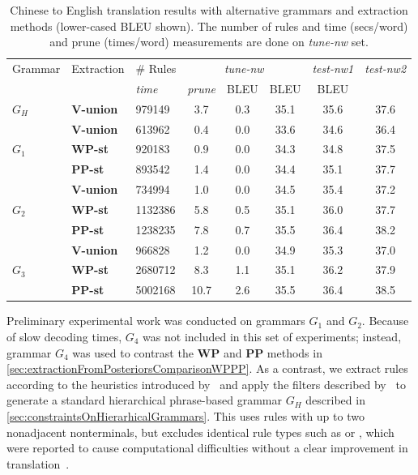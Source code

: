 \begin{table}
  \begin{center}
    \begin{tabular}{|l|l|l||c|c|c||c||c|}
      \hline
      Grammar & Extraction & \# Rules & \multicolumn{3}{c||}{{\em tune-nw}} & {\em test-nw1} & {\em test-nw2} \\  \cline{3-7}
      &            & {\em time} & {\em prune} & BLEU & BLEU & BLEU \\ \hline
      $G_H$ & {\bf V-union} & 979149 & 3.7 & 0.3 & 35.1 & 35.6 & 37.6  \\
      \hline
      & {\bf V-union} & 613962 & 0.4 & 0.0 & 33.6 & 34.6 & 36.4  \\
      $G_1$ & {\bf WP-st} & 920183 & 0.9 & 0.0  & 34.3 & 34.8 & 37.5  \\
      & {\bf PP-st} & 893542 & 1.4 & 0.0 & 34.4 & 35.1 & 37.7   \\
      \hline
      & {\bf V-union} & 734994 & 1.0 & 0.0 & 34.5  & 35.4  & 37.2   \\
      $G_2$ & {\bf WP-st} & 1132386 & 5.8 & 0.5 & 35.1 & 36.0  & 37.7   \\
      & {\bf PP-st} & 1238235 & 7.8 & 0.7 & 35.5 & 36.4  & 38.2   \\
      \hline
      & {\bf V-union} & 966828 & 1.2 & 0.0 & 34.9 & 35.3  & 37.0   \\
      $G_3$ & {\bf WP-st} & 2680712 & 8.3 & 1.1 & 35.1  & 36.2  & 37.9   \\
      & {\bf PP-st} & 5002168 & 10.7 &  2.6  & 35.5 & 36.4  & 38.5  \\
      \hline
    \end{tabular}
    \caption{Chinese to English translation results with alternative grammars and extraction methods (lower-cased BLEU shown). The number of rules and time (secs/word) and prune (times/word) measurements are done on {\em tune-nw} set.}
    \label{tab:extractionFromPosteriorsTranslationResults}
  \end{center}
\end{table}
%
Preliminary experimental work
was conducted on grammars $G_1$ and $G_2$.
Because of slow decoding times, $G_4$ was not included in this set
of experiments; instead, grammar $G_4$ was used to contrast the \textbf{WP}
and \textbf{PP} methods in \autoref{sec:extractionFromPosteriorsComparisonWPPP}.
As a contrast, we extract rules according to the heuristics introduced
by~\citet{chiang:2007:CL} and apply the filters described
by~\citet{iglesias-degispert-banga-byrne:2009:EACL} to generate a standard
hierarchical phrase-based grammar $G_H$ described in
\autoref{sec:constraintsOnHierarhicalGrammars}.
This uses rules with up to two nonadjacent
nonterminals, but excludes identical rule types such as \RT[$X$][$w~X$][$w~X$]
or \RT[$X$][$w~X_1~w~X_2$][$w~X_1~w~X_2$], which were reported to cause
computational difficulties without a clear improvement in
translation~\citep{iglesias-degispert-banga-byrne:2009:EACL}. 

